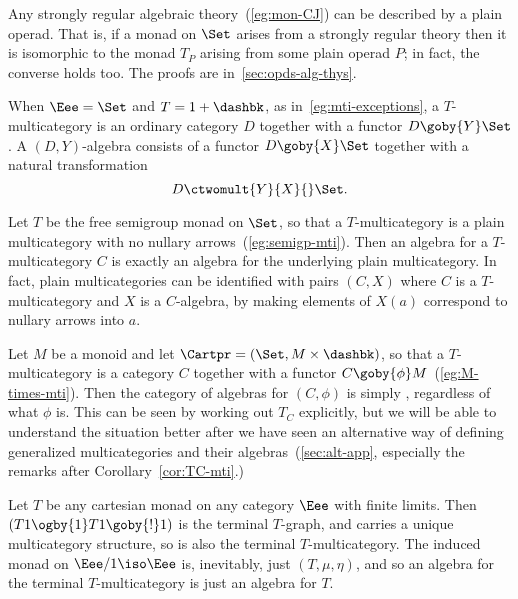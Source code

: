 \begin{example}%
%
%
Any strongly regular algebraic theory~(\ref{eg:mon-CJ}) can be described by
a plain operad.  That is, if a monad on $\Set$ arises from a strongly
regular theory then it is isomorphic to the monad $T_P$ arising from some
plain operad $P$; in fact, the converse holds too.  The proofs are
in~\ref{sec:opds-alg-thys}.
\end{example}


\begin{example}	
When $\Eee=\Set$ and $T= 1+\dashbk$,%
%
%
%
%
%
as in~\ref{eg:mti-exceptions}, a
$T$-multicategory is an ordinary category $D$ together with a functor
$D\goby{Y}\Set$.  A $(D,Y)$-algebra consists of a functor $D \goby{X} \Set$
together with a natural transformation
\[
D \ctwomult{Y}{X}{} \Set.
\] 
\end{example}

\begin{example}
Let $T$ be the free semigroup%
%
%
monad on $\Set$, so that a $T$-multicategory
is a plain multicategory with no nullary%
%
%
arrows~(\ref{eg:semigp-mti}).
Then an algebra for a $T$-multicategory $C$ is exactly an algebra for the
underlying plain multicategory.  In fact, plain multicategories can be
identified with pairs $(C, X)$ where $C$ is a $T$-multicategory and $X$ is
a $C$-algebra, by making elements of $X(a)$ correspond to nullary arrows
into $a$.
\end{example}

\begin{example}	
Let $M$ be a monoid%
%
%
%
%
%
and let $\Cartpr = (\Set, M\times\dashbk)$, so that
a $T$-mul\-ti\-cat\-e\-gory is a category $C$ together with a functor $C
\goby{\phi} M$~(\ref{eg:M-times-mti}).  Then the category of algebras for
$(C, \phi)$ is simply , regardless of what $\phi$ is.
This can be seen by working out $T_C$ explicitly, but we will be able to
understand the situation better after we have seen an alternative way of
defining generalized multicategories and their algebras~(\ref{sec:alt-app},
especially the remarks after Corollary~\ref{cor:TC-mti}.)
\end{example}

\begin{example}		
Let $T$ be any cartesian monad on any category $\Eee$ with finite limits.
Then $(T1 \ogby{1} T1 \goby{!} 1)$ is the terminal $T$-graph, and carries a
unique multicategory structure, so is also the terminal%
%
%
$T$-multicategory.
The induced monad on $\Eee/1 \iso \Eee$ is, inevitably, just $(T, \mu,
\eta)$, and so an algebra for the terminal $T$-multicategory is just an
algebra for $T$.
\end{example}


